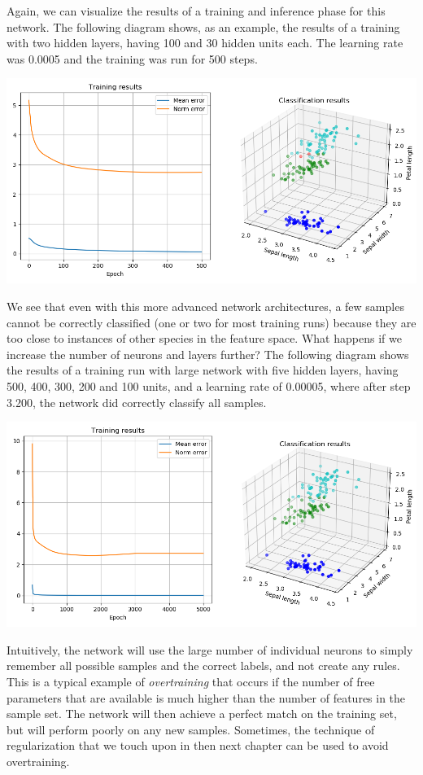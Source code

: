 \documentclass[a4paper, draft]{report}
\numberwithin{section}{chapter}
\numberwithin{equation}{chapter}
\theoremstyle{own}
\theoremstyle{remark}
\begin{document}
Again, we can visualize the results of a training and inference phase for this network. The following diagram shows, as an example, the results of a training with two hidden layers, having 100 and 30 hidden units each. The learning rate was 0.0005 and the training was run for
500 steps. 

\includegraphics[scale=0.47]{LayeredNetworkIris.png}

We see that even with this more advanced network architectures, a few samples cannot be correctly classified (one or two for most training runs) because they are too close to instances of other species in the feature space. What happens if we increase the number of neurons and layers further?  The following diagram shows the results of a training run with large network with five hidden layers, having 500, 400, 300, 200 and 100 units, and a learning rate of 0.00005, where after step 3.200, the network did correctly classify all samples.

\includegraphics[scale=0.47]{LayeredNetworkIrisLarge.png}

Intuitively, the network will use the large number of individual neurons to simply remember all possible samples and the correct labels, and not create any rules. This is a typical example of {\em overtraining} that occurs if the number of free parameters that are available is much higher than the number of features in the sample set. The network will then achieve a perfect match on the training set, but will perform poorly on any new samples. Sometimes, the technique of regularization that we touch upon in then next chapter can be used to avoid overtraining.
\end{document}
